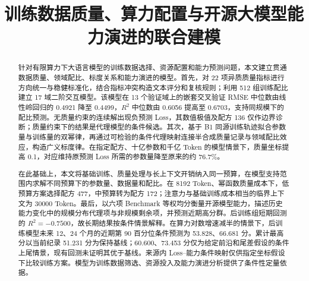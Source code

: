 \documentclass[bwprint]{gmcmthesis}
\title{训练数据质量、算力配置与开源大模型能力演进的联合建模}
\begin{document}
\maketitle

\begin{abstract}

针对有限算力下大语言模型的训练数据选择、资源配置和能力预测问题，本文建立贯通数据质量、领域配比、标度关系和能力演进的模型。首先，对 22 项异质质量指标进行方向统一与稳健标准化，结合指标冲突构造文本评分和复核规则；利用 512 组训练配比建立 17 域二阶交互模型。该模型在 13 个验证域上的嵌套交叉验证 RMSE 中位数由线性岭回归的 0.4921 降至 0.4499，$R^2$ 中位数由 0.6056 提高至 0.6703，支持同规模下的配比预测。无质量约束的连续解出现负预测 Loss，其数值极值及配方 136 仅作边界诊断；质量约束下的结果是代理模型的条件候选。其次，基于 B1 同源训练轨迹拟合参数量与训练量的双幂律，再通过可检验的条件代理映射连接半合成质量记录与领域配比效应，构造广义标度律。在指定配方、十亿参数和千亿 Token 的模型情景下，质量坐标提高 0.1，对应维持原预测 Loss 所需的参数量降至原来的约 76.7\%。

在此基础上，本文将基础训练、质量处理与长上下文开销纳入同一预算，在模型支持范围内求解不同预算下的参数量、数据量和配比。在 8192 Token、幂函数质量成本下，低预算方案选择配方 477，中预算转为配方 172；注意力与基础训练成本相当的临界上下文为 30000 Token。最后，以六项 Benchmark 等权均分衡量开源模型能力，描述历史能力变化中的规模分布代理项与非规模剩余项，并预测近期高分群。后训练组短期回测的 $R^2=-0.7500$，故长期结果按条件情景解释。在算力对数增速减半的情景下，后训练模型未来 12、24 个月的近期第 90 百分位条件预测为 53.828、66.681 分。累计最高分以当前纪录 51.231 分为保持基线；60.600、73.453 分仅为给定前沿和尾差假设的条件上尾情景，现有回测未证明其优于基线。来源内 Loss--能力条件映射仅供指定坐标假设下比较训练方案。模型为训练数据筛选、资源投入及能力演进分析提供了条件性定量依据。


\end{abstract}

\pagestyle{plain}

\maketoc

\clearpage
















\end{document}
